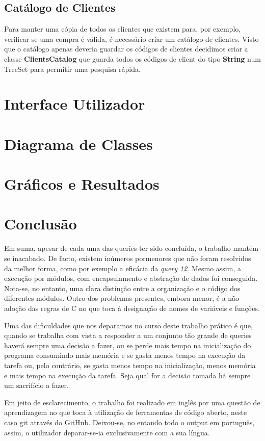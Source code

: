 \documentclass[10pt] {article}
\begin{document}
\subsection{Catálogo de Clientes}
\par Para manter uma cópia de todos os clientes que existem para, por exemplo, verificar se uma compra é válida, é necessário 
criar um catálogo de clientes. Visto que o catálogo apenas deveria guardar os códigos de clientes decidimos criar a classe 
\textbf{ClientsCatalog} que guarda todos os códigos de client do tipo \textbf{String} num TreeSet para permitir uma pesquisa 
rápida.

\newpage
\section{Interface Utilizador}

\newpage
\section{Diagrama de Classes}

\newpage
\section{Gráficos e Resultados}

\newpage
\section{Conclusão}

\indent\par Em suma, apesar de cada uma das queries ter sido concluída, o trabalho mantém-se inacabado. De
facto, existem inúmeros pormenores que não foram resolvidos da melhor forma, como por exemplo a
eficácia da \emph{query 12}. Mesmo assim, a execução por módulos, com encapsulamento e abstração de dados
foi conseguida. Nota-se, no entanto, uma clara distinção entre a organização e o código dos diferentes módulos.
Outro dos problemas presentes, embora menor, é a não adoção das regras de C no que toca à designação de
nomes de variáveis e funções.
\par Uma das dificuldades que nos deparamos no curso deste trabalho prático é que, quando se trabalha com vista a responder a um conjunto tão grande de queries
haverá sempre uma decisão a fazer, ou se perde mais tempo na inicialização do programa consumindo mais memória e se gasta
menos tempo na execução da tarefa ou, pelo contrário, se gasta menos tempo na inicialização, menos memória e mais tempo na
execução da tarefa. Seja qual for a decisão tomada há sempre um sacrifício a fazer.
\par Em jeito de esclarecimento, o trabalho foi realizado em inglês por uma questão de aprendizagem no que toca à
utilização de ferramentas de código aberto, neste caso git através do GitHub. Deixou-se, no entando todo o output em português, assim, o utilizador
deparar-se-ia exclusivamente com a sua língua.
\end{document}

